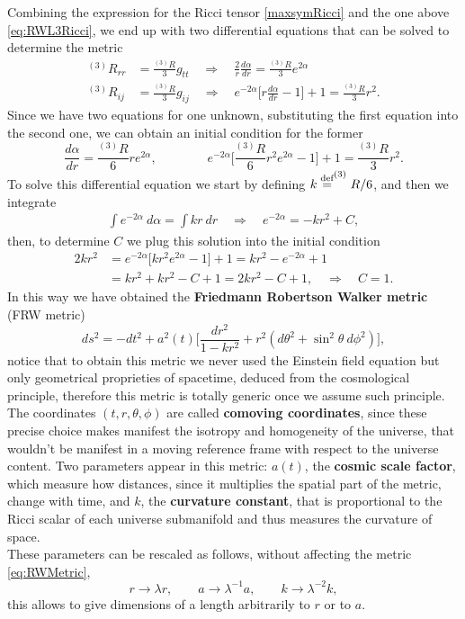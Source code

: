 Combining the expression for the Ricci tensor \eqref{maxsymRicci} and the one above \eqref{eq:RWL3Ricci}, we end up with two differential equations that can be solved to determine the metric
\begin{align*}
    ^{(3)}R_{rr}&=\frac{^{(3)}R}{3}g_{tt}\quad\Rightarrow\quad\boxed{\frac{2}{r}\frac{d\alpha}{dr}=\frac{^{(3)}R}{3}e^{2\alpha}}\\ ^{(3)}R_{ij}&=\frac{^{(3)}R}{3}g_{ij}\quad\Rightarrow\quad \boxed{e^{-2\alpha}\bigg[r\frac{d\alpha}{dr}-1\bigg]+1=\frac{^{(3)}R}{3}r^2}.
\end{align*}
Since we have two equations for one unknown, substituting the first equation into the second one, we can obtain an initial condition for the former
\begin{equation*}
    \frac{d\alpha}{dr}=\frac{^{(3)}R}{6}re^{2\alpha},\qquad\qquad e^{-2\alpha}\bigg[\frac{^{(3)}R}{6}r^2e^{2\alpha}-1\bigg]+1=\frac{^{(3)}R}{3}r^2.
\end{equation*}
To solve this differential equation we start by defining $k\stackrel{\text{def}}{=}^{(3)}R/6$, and then we integrate
\begin{align*}
    \int e^{-2\alpha}\ d\alpha=\int kr\ dr\quad \Rightarrow\quad e^{-2\alpha}=-kr^2+C,
\end{align*}
then, to determine $C$ we plug this solution into the initial condition
\begin{align*}
    2kr^2&=e^{-2\alpha}\bigg[kr^2e^{2\alpha}-1\bigg]+1=kr^2-e^{-2\alpha}+1\\
       &=kr^2+kr^2-C+1=2kr^2-C+1,\quad \Rightarrow\quad \boxed{C=1}.
\end{align*}    
In this way we have obtained the \textbf{Friedmann Robertson Walker metric} (FRW metric)
\begin{equation}\label{eq:RWMetric}
    ds^2=-dt^2+a^2(t)\bigg[\frac{dr^2}{1-kr^2}+r^2(d\theta^2+\sin^2\theta\ d\phi^2)\bigg],
\end{equation}
notice that to obtain this metric we never used the Einstein field equation but only geometrical proprieties of spacetime, deduced from the cosmological principle, therefore this metric is totally generic once we assume such principle.\\
The coordinates $(t,r,\theta,\phi)$ are called \textbf{comoving coordinates}, since these precise choice makes manifest the isotropy and homogeneity of the universe, that wouldn't be manifest in a moving reference frame with respect to the universe content.
Two parameters appear in this metric:
$a(t)$, the \textbf{cosmic scale factor}, which measure how distances, since it multiplies the spatial part of the metric, change with time, and
$k$, the \textbf{curvature constant}, that is proportional to the Ricci scalar of each universe submanifold and thus measures the curvature of space.\\
These parameters can be rescaled as follows, without affecting the metric \eqref{eq:RWMetric},
\begin{equation*}
    r\rightarrow\lambda r,\qquad a\rightarrow\lambda^{-1} a,\qquad k\rightarrow\lambda^{-2} k,
\end{equation*}
this allows to give dimensions of a length arbitrarily to $r$ or to $a$.

